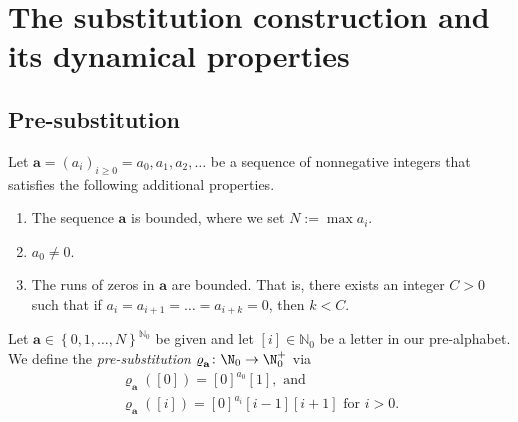 \section{The substitution construction and its dynamical properties} 
\label{sec:comp}

%
%
%
%
%

\subsection{Pre-substitution}

Let $\mathbf a=(a_i)_{i\geqslant 0}=a_0,a_1,a_2,\ldots$ be a sequence of nonnegative integers that satisfies the following additional properties.

\begin{enumerate}[label={(A\arabic*)}]
\item \label{def:a1} The sequence $\mathbf a$ is bounded, where we set $N:=\max a_i$.
\item \label{def:a2} $a_0\neq 0$.
\item \label{def:a3} The runs of zeros in $\mathbf a$ are bounded. That is, there exists an integer $C>0$ such that if $a_i=a_{i+1}=\ldots=a_{i+k}=0$, then $k<C$.
\end{enumerate}

%


\begin{definition} \label{def:substitution}


Let $\mathbf a\in \left\{0,1,\ldots,N\right\}^{\mathbb{N}_0}$ be given and let $[i]\in\mathbb{N}_0$ be a letter in our pre-alphabet. We define the {\it pre-substitution} $\varrho^{ }_\mathbf a\colon \N_0\to \N_0^{+}$ via
$$
\begin{array}{l}
\varrho^{ }_\mathbf a([0])=[0]^{a_0}[1], \text{ and}\\
\varrho^{ }_\mathbf a([i])=[0]^{a_i}[i-1][i+1] \text{ for }i>0.
\end{array}
$$
\end{definition}


